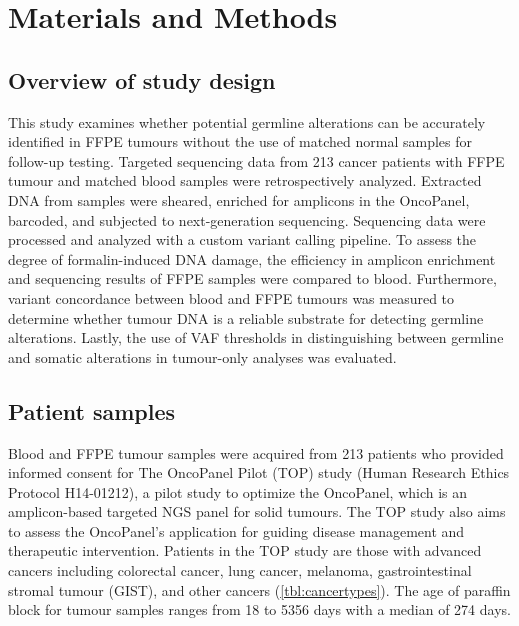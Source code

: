 
\chapter{Materials and Methods}
\label{ch:Materialsandmethods}

\section{Overview of study design}
\label{sec:Overviewofstudydesign}

This study examines whether potential germline alterations can be accurately identified in FFPE tumours without the use of matched normal samples for follow-up testing. Targeted sequencing data from 213 cancer patients with FFPE tumour and matched blood samples were retrospectively analyzed. Extracted DNA from samples were sheared, enriched for amplicons in the OncoPanel, barcoded, and subjected to next-generation sequencing. Sequencing data were processed and analyzed with a custom variant calling pipeline. To assess the degree of formalin-induced DNA damage, the efficiency in amplicon enrichment and sequencing results of FFPE samples were compared to blood. Furthermore, variant concordance between blood and FFPE tumours was measured to determine whether tumour DNA is a reliable substrate for detecting germline alterations. Lastly, the use of VAF thresholds in distinguishing between germline and somatic alterations in tumour-only analyses was evaluated.

\section{Patient samples}
\label{sec:Patientsamples}

Blood and FFPE tumour samples were acquired from 213 patients who provided informed consent for The OncoPanel Pilot (TOP) study (Human Research Ethics Protocol H14­-01212), a pilot study to optimize the OncoPanel, which is an amplicon-based targeted NGS panel for solid tumours. The TOP study also aims to assess the OncoPanel's application for guiding disease management and therapeutic intervention. Patients in the TOP study are those with advanced cancers including colorectal cancer, lung cancer, melanoma, gastrointestinal stromal tumour (GIST), and other cancers (\autoref{tbl:cancertypes}). The age of paraffin block for tumour samples ranges from 18 to 5356 days with a median of 274 days.

